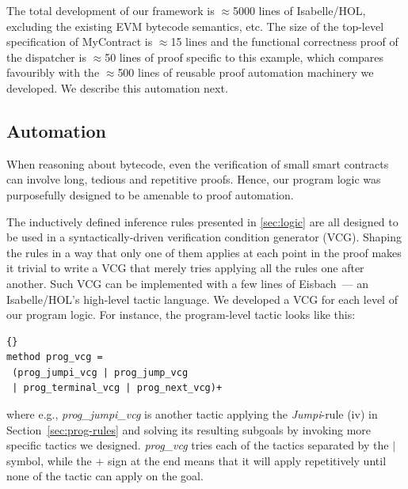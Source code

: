 \documentclass[sigplan,10pt,review]{acmart}\settopmatter{printfolios=true,printccs=false,printacmref=false}
\begin{document}

The total development of our framework is $\approx$5000 lines of Isabelle/HOL,
excluding the existing EVM bytecode semantics, etc.
The size of the top-level specification of MyContract is $\approx$15 lines
and the functional correctness proof of the dispatcher is
$\approx$50 lines of proof specific to this example, which compares
favouribly with the $\approx$500 lines of reusable proof
automation machinery we developed.
We describe this automation next.





\subsection{Automation}
\label{sec:auto}

When reasoning about bytecode, even the verification of small smart contracts
can involve long, tedious and repetitive proofs.
Hence, our program logic was purposefully designed to be
amenable to proof automation.

The inductively defined inference rules presented in \autoref{sec:logic}
are all designed to be used in a syntactically-driven verification
condition generator (VCG).
Shaping the rules in a way that only one of them applies at each point in the
proof makes it trivial to write a VCG that merely tries applying all the rules
one after another.
Such VCG can be implemented with a few lines of Eisbach~\cite{Matichuk_MW_16}---
an Isabelle/HOL's high-level tactic language.
We developed a VCG for each level of our program logic.
For instance, the program-level tactic looks like this:
\begin{lstlisting}[language=Isar]{}
method prog_vcg =
 (prog_jumpi_vcg | prog_jump_vcg
 | prog_terminal_vcg | prog_next_vcg)+
\end{lstlisting}
where e.g., \textit{prog\_jumpi\_vcg} is another tactic applying the \textit{Jumpi}-rule (iv) 
in Section~\ref{sec:prog-rules} and solving its resulting subgoals by
invoking more specific tactics we designed.
\textit{prog\_vcg} tries each of the tactics separated by the $|$ symbol,
while the $+$ sign at the end means that it will apply repetitively until
none of the tactic can apply on the goal.
\end{document}
